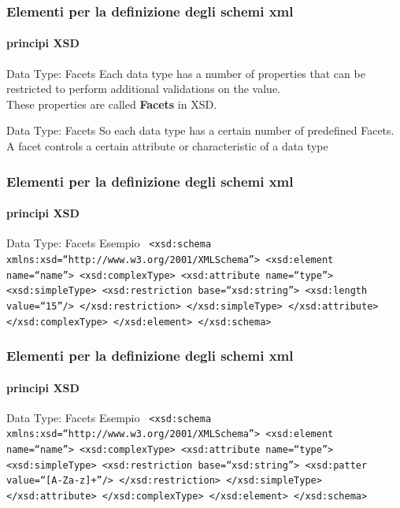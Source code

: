 \begin{frame}
	\frametitle{Elementi per la definizione degli schemi xml}
	\framesubtitle{principi XSD}
	\addtocounter{nframe}{1}

	\begin{block}{Data Type: Facets}
		Each data type has a number of properties that can be restricted to perform additional validations on the value.
		\\These properties are called \textbf{Facets} in XSD.
	\end{block}

	\begin{block}{Data Type: Facets}
		So each data type has a certain number of predefined Facets.
		\\A facet controls a certain attribute or characteristic of a data type
	\end{block}

\end{frame}

\begin{frame}
	\frametitle{Elementi per la definizione degli schemi xml}
	\framesubtitle{principi XSD}
	\addtocounter{nframe}{1}

	\begin{block}{Data Type: Facets Esempio}
		\texttt{
			<xsd:schema xmlns:xsd=``http://www.w3.org/2001/XMLSchema''>
			<xsd:element name=``name''>
			<xsd:complexType>
			<xsd:attribute name=``type''>
			<xsd:simpleType>
			<xsd:restriction base=``xsd:string''>
			<xsd:length value=``15''/>
			</xsd:restriction>
			</xsd:simpleType>
			</xsd:attribute>
			</xsd:complexType>
			</xsd:element>
			</xsd:schema>
		}

	\end{block}

\end{frame}

\begin{frame}
	\frametitle{Elementi per la definizione degli schemi xml}
	\framesubtitle{principi XSD}
	\addtocounter{nframe}{1}

	\begin{block}{Data Type: Facets Esempio}
		\texttt{
		<xsd:schema xmlns:xsd=``http://www.w3.org/2001/XMLSchema''>
		<xsd:element name=``name''>
		<xsd:complexType>
		<xsd:attribute name=``type''>
		<xsd:simpleType>
		<xsd:restriction base=``xsd:string''>
		<xsd:patter value=``[A-Za-z]+''/>
		</xsd:restriction>
		</xsd:simpleType>
		</xsd:attribute>
		</xsd:complexType>
		</xsd:element>
		</xsd:schema>
		}

	\end{block}

\end{frame}

